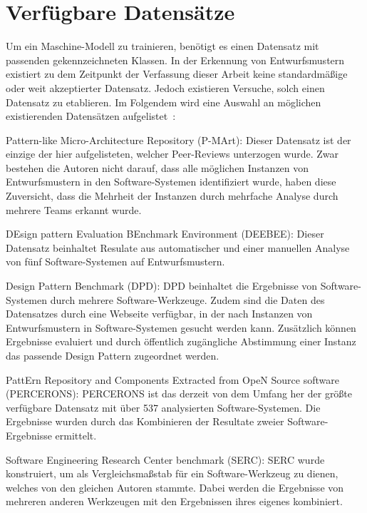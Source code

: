 \section{Verfügbare Datensätze}\label{dataset}
Um ein Maschine-Modell zu trainieren, benötigt es einen Datensatz mit passenden gekennzeichneten Klassen.
In der Erkennung von Entwurfsmustern existiert zu dem Zeitpunkt der Verfassung dieser Arbeit keine standardmäßige oder weit akzeptierter Datensatz.
Jedoch existieren Versuche, solch einen Datensatz zu etablieren. Im Folgendem wird eine Auswahl an möglichen existierenden Datensätzen aufgelistet~\cite[S. 104 - 105]{phdthesis}:

\begin{description}
    \item Pattern-like Micro-Architecture Repository (P-MArt): Dieser Datensatz ist der einzige der hier aufgelisteten, welcher Peer-Reviews unterzogen wurde. Zwar bestehen die Autoren nicht darauf, dass alle möglichen Instanzen von Entwurfsmustern in den Software-Systemen identifiziert wurde, haben diese Zuversicht, dass die Mehrheit der Instanzen durch mehrfache Analyse durch mehrere Teams erkannt wurde. 
    \item DEsign pattern Evaluation BEnchmark Environment (DEEBEE): Dieser Datensatz beinhaltet Resulate aus automatischer und einer manuellen Analyse von fünf Software-Systemen auf Entwurfsmustern.
    \item Design Pattern Benchmark (DPD): DPD beinhaltet die Ergebnisse von Software-Systemen durch mehrere Software-Werkzeuge. Zudem sind die Daten des Datensatzes durch eine Webseite verfügbar, in der nach Instanzen von Entwurfsmustern in Software-Systemen gesucht werden kann. Zusätzlich können Ergebnisse evaluiert und durch öffentlich zugängliche Abstimmung einer Instanz das passende Design Pattern zugeordnet werden.
    \item PattErn Repository and Components Extracted from OpeN Source software (PERCERONS): PERCERONS ist das derzeit von dem Umfang her der größte verfügbare Datensatz mit über 537 analysierten Software-Systemen. Die Ergebnisse wurden durch das Kombinieren der Resultate zweier Software-Ergebnisse ermittelt.
    \item Software Engineering Research Center benchmark (SERC): SERC wurde konstruiert, um als Vergleichsmaßstab für ein Software-Werkzeug zu dienen, welches von den gleichen Autoren stammte. Dabei werden die Ergebnisse von mehreren anderen Werkzeugen mit den Ergebnissen ihres eigenes kombiniert.
\end{description}

